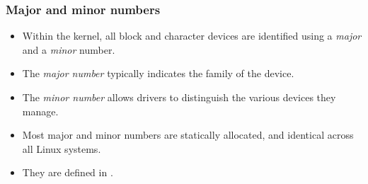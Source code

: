 \begin{frame}
  \frametitle{Major and minor numbers}
  \begin{itemize}
  \item Within the kernel, all block and character devices are
    identified using a {\em major} and a {\em minor} number.
  \item The {\em major number} typically indicates the family of the
    device.
  \item The {\em minor number} allows drivers to distinguish
    the various devices they manage.
  \item Most major and minor numbers are statically allocated, and
    identical across all Linux systems.
  \item They are defined in .
  \end{itemize}
\end{frame}
